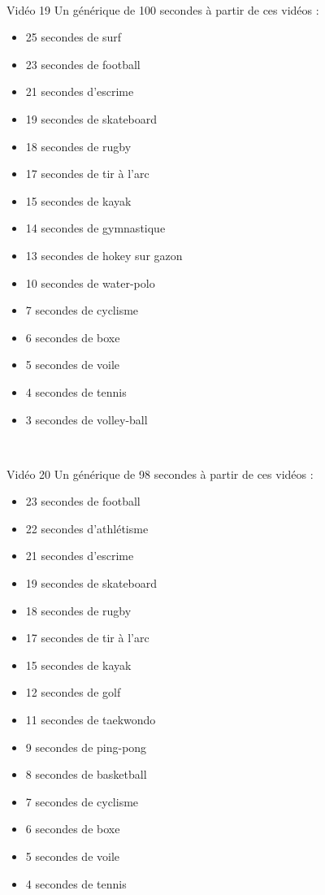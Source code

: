 \documentclass[10pt, a5paper,twoside]{article}
\begin{document}
\vfill

\clearpage
~
\vfill

\begin{card}[width = \textwidth, colback = olympicgreen, colframe = olympicgreen, bottomtitle = 2mm]{Vidéo 19}
  Un générique de 100 secondes à partir de ces vidéos :
  \vspace{-1mm}\begin{itemize}
    \item 25 secondes de surf
    \item 23 secondes de football
    \item 21 secondes d'escrime
    \item 19 secondes de skateboard
    \item 18 secondes de rugby
    \item 17 secondes de tir à l'arc
    \item 15 secondes de kayak
    \item 14 secondes de gymnastique
    \item 13 secondes de hokey sur gazon
    \item 10 secondes de water-polo
    \item 7 secondes de cyclisme
    \item 6 secondes de boxe
    \item 5 secondes de voile
    \item 4 secondes de tennis
    \item 3 secondes de volley-ball
  \end{itemize}
\end{card}

\vfill

\clearpage
~
\vfill

\begin{card}[width = \textwidth, colback = olympicgreen, colframe = olympicgreen, bottomtitle = 2mm]{Vidéo 20}
  Un générique de 98 secondes à partir de ces vidéos :
  \vspace{-1mm}\begin{itemize}
    \item 23 secondes de football
    \item 22 secondes d'athlétisme
    \item 21 secondes d'escrime
    \item 19 secondes de skateboard
    \item 18 secondes de rugby
    \item 17 secondes de tir à l'arc
    \item 15 secondes de kayak
    \item 12 secondes de golf
    \item 11 secondes de taekwondo
    \item 9 secondes de ping-pong
    \item 8 secondes de basketball
    \item 7 secondes de cyclisme
    \item 6 secondes de boxe
    \item 5 secondes de voile
    \item 4 secondes de tennis
  \end{itemize}
\end{card}
\end{document}
